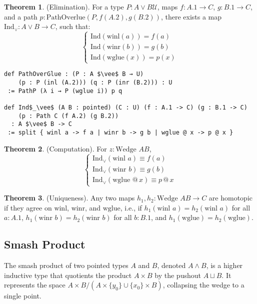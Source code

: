 \documentclass{article}
\theoremstyle{definition}
\newtheorem{theorem}{Theorem}
\begin{document}
\begin{theorem} (Elimination).
For a type \( P : A \vee B \mathcal{U} \), maps \( f : A.1 \to C \),
\( g : B.1 \to C \), and a path \( p : \text{PathOverlue}(P,f(A.2),g (B.2)) \),
there exists a map \( \text{Ind}_\vee : A \vee B \to C \), such that:
\[
\begin{cases}
\text{Ind}(\text{winl}(a)) = f(a) \\
\text{Ind}(\text{winr}(b)) = g(b) \\
\text{Ind}(\text{wglue}(x)) = p(x)
\end{cases}
\]
\begin{lstlisting}[mathescape=true]
def PathOverGlue : (P : A $\vee$ B → U)
    (p : P (inl (A.2))) (q : P (inr (B.2))) : U
 := PathP (λ i → P (wglue i)) p q

def Ind$_\vee$ (A B : pointed) (C : U) (f : A.1 -> C) (g : B.1 -> C)
    (p : Path C (f A.2) (g B.2))
  : A $\vee$ B -> C
 := split { winl a -> f a | winr b -> g b | wglue @ x -> p @ x }
\end{lstlisting}
\end{theorem}

\begin{theorem} (Computation).
For \( z : \text{Wedge } A B \),
\[
\begin{cases}
\text{Ind}_\vee(\text{winl } a) \equiv f(a) \\
\text{Ind}_\vee(\text{winr } b) \equiv g(b) \\
\text{Ind}_\vee(\text{wglue } @ \, x) \equiv p \, @ \, x
\end{cases}
\]
\end{theorem}

\begin{theorem} (Uniqueness).
Any two maps \( h_1, h_2 : \text{Wedge } A B \to C \) are homotopic if
they agree on \( \text{winl} \), \( \text{winr} \), and \( \text{wglue} \),
i.e., if \( h_1(\text{winl } a) = h_2(\text{winl } a) \) for
all \( a : A.1 \), \( h_1(\text{winr } b) = h_2(\text{winr } b) \) for
all \( b : B.1 \), and \( h_1(\text{wglue}) = h_2(\text{wglue}) \).
\end{theorem}

\newpage
\subsection{Smash Product}
The smash product of two pointed types \( A \) and \( B \), denoted \( A \wedge B \),
is a higher inductive type that quotients the product \( A \times B \) by
the pushout \( A \sqcup B \). It represents the space \( A \times B / (A \times \{ y_0 \} \cup \{ x_0 \} \times B) \),
collapsing the wedge to a single point.
\end{document}
